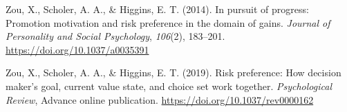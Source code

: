\documentclass[man,floatsintext]{apa6}
\begin{document}
\leavevmode\hypertarget{ref-zouetal2014}{}%
Zou, X., Scholer, A. A., \& Higgins, E. T. (2014). In pursuit of progress: Promotion motivation and risk preference in the domain of gains. \emph{Journal of Personality and Social Psychology}, \emph{106}(2), 183--201. \url{https://doi.org/10.1037/a0035391}

\leavevmode\hypertarget{ref-zouetal2019}{}%
Zou, X., Scholer, A. A., \& Higgins, E. T. (2019). Risk preference: How decision maker's goal, current value state, and choice set work together. \emph{Psychological Review}, Advance online publication. \url{https://doi.org/10.1037/rev0000162}

\endgroup
\end{document}
